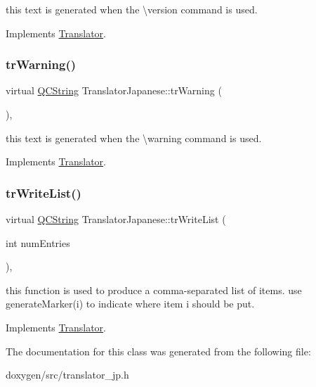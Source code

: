 this text is generated when the \textbackslash{}version command is used. 

Implements \mbox{\hyperlink{class_translator}{Translator}}.

\mbox{\label{class_translator_japanese_a5e367bc6baa5dc916fa8633c65635301}} 
\subsubsection{\texorpdfstring{trWarning()}{trWarning()}}
{\footnotesize\ttfamily virtual \mbox{\hyperlink{class_q_c_string}{Q\+C\+String}} Translator\+Japanese\+::tr\+Warning (\begin{DoxyParamCaption}{ }\end{DoxyParamCaption})\hspace{0.3cm}{\ttfamily [inline]}, {\ttfamily [virtual]}}

this text is generated when the \textbackslash{}warning command is used. 

Implements \mbox{\hyperlink{class_translator}{Translator}}.

\mbox{\label{class_translator_japanese_a2d1dcae8604927539b593930394dd6dd}} 
\subsubsection{\texorpdfstring{trWriteList()}{trWriteList()}}
{\footnotesize\ttfamily virtual \mbox{\hyperlink{class_q_c_string}{Q\+C\+String}} Translator\+Japanese\+::tr\+Write\+List (\begin{DoxyParamCaption}\item[{int}]{num\+Entries }\end{DoxyParamCaption})\hspace{0.3cm}{\ttfamily [inline]}, {\ttfamily [virtual]}}

this function is used to produce a comma-\/separated list of items. use generate\+Marker(i) to indicate where item i should be put. 

Implements \mbox{\hyperlink{class_translator}{Translator}}.



The documentation for this class was generated from the following file\+:\begin{DoxyCompactItemize}
\item 
doxygen/src/translator\+\_\+jp.\+h\end{DoxyCompactItemize}
